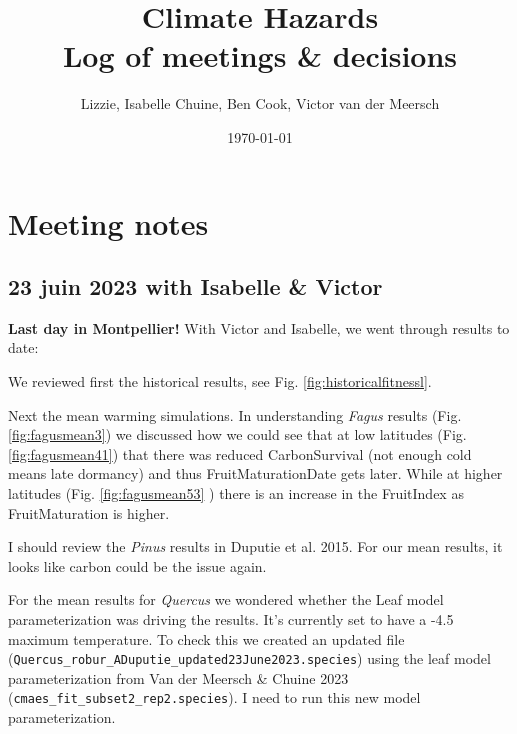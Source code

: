 \documentclass[11pt,letter]{article}
\begin{document}

\renewcommand{\refname}{\CHead{}}

\title{Climate Hazards \\ Log of meetings \& decisions}
\author{Lizzie, Isabelle Chuine, Ben Cook, Victor van der Meersch}
\date{\today}
\maketitle
\tableofcontents


\section{Meeting notes}

\subsection{23 juin 2023 with Isabelle \& Victor}
{\bf Last day in Montpellier!} With Victor and Isabelle, we went through results to date:

We reviewed first the historical results, see Fig. \ref{fig:historicalfitnessl}. 

Next the mean warming simulations. In understanding \emph{Fagus} results (Fig. \ref{fig:fagusmean3}) we discussed how we could see that at low latitudes (Fig. \ref{fig:fagusmean41}) that there was reduced CarbonSurvival (not enough cold means late dormancy) and thus FruitMaturationDate gets later. While at higher latitudes (Fig. \ref{fig:fagusmean53} ) there is an increase in the FruitIndex as FruitMaturation is higher. 

I should review the \emph{Pinus} results in Duputie et al. 2015. For our mean results, it looks like carbon could be the issue again. 

For the mean results for \emph{Quercus} we wondered whether the Leaf model parameterization was driving the results. It's currently set to have a -4.5 maximum temperature. To check this we created an updated file (\verb|Quercus_robur_ADuputie_updated23June2023.species|) using the leaf model parameterization from Van der Meersch \& Chuine 2023 (\verb|cmaes_fit_subset2_rep2.species|). I need to run this new model parameterization.
\end{document}
